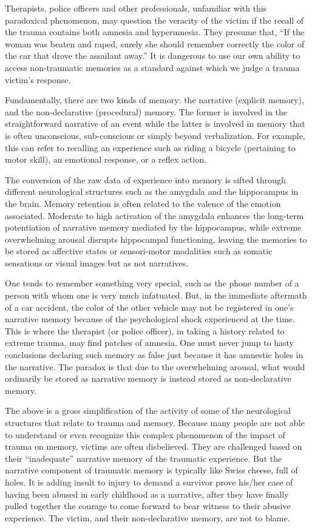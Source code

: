 \documentclass[]{book}
\begin{document}
Therapists, police officers and other professionals, unfamiliar with this paradoxical phenomenon, may question the veracity of the victim if the recall of the trauma contains both amnesia and hypermnesia. They presume that, ``If the woman was beaten and raped, surely she should remember correctly the color of the car that drove the assailant away.'' It is dangerous to use our own ability to access non-traumatic memories as a standard against which we judge a trauma victim's response.

Fundamentally, there are two kinds of memory: the narrative (explicit memory), and the non-declarative (procedural) memory. The former is involved in the straightforward narrative of an event while the latter is involved in memory that is often unconscious, sub-conscious or simply beyond verbalization. For example, this can refer to recalling an experience such as riding a bicycle (pertaining to motor skill), an emotional response, or a reflex action.

The conversion of the raw data of experience into memory is sifted through different neurological structures such as the amygdala and the hippocampus in the brain. Memory retention is often related to the valence of the emotion associated. Moderate to high activation of the amygdala enhances the long-term potentiation of narrative memory mediated by the hippocampus, while extreme overwhelming arousal disrupts hippocampal functioning, leaving the memories to be stored as affective states or sensori-motor modalities such as somatic sensations or visual images but as not narratives.

One tends to remember something very special, such as the phone number of a person with whom one is very much infatuated. But, in the immediate aftermath of a car accident, the color of the other vehicle may not be registered in one's narrative memory because of the psychological shock experienced at the time. This is where the therapist (or police officer), in taking a history related to extreme trauma, may find patches of amnesia. One must never jump to hasty conclusions declaring such memory as false just because it has amnestic holes in the narrative. The paradox is that due to the overwhelming arousal, what would ordinarily be stored as narrative memory is instead stored as non-declarative memory.

The above is a gross simplification of the activity of some of the neurological structures that relate to trauma and memory. Because many people are not able to understand or even recognize this complex phenomenon of the impact of trauma on memory, victims are often disbelieved. They are challenged based on their ``inadequate'' narrative memory of the traumatic experience. But the narrative component of traumatic memory is typically like Swiss cheese, full of holes. It is adding insult to injury to demand a survivor prove his/her case of having been abused in early childhood as a narrative, after they have finally pulled together the courage to come forward to bear witness to their abusive experience. The victim, and their non-declarative memory, are not to blame.
\end{document}
